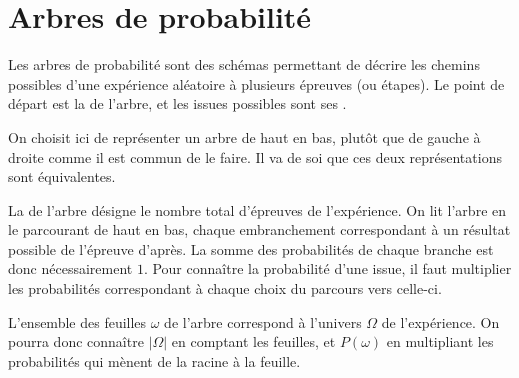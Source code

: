 

\section{Arbres de probabilité}

Les arbres de probabilité sont des schémas permettant de décrire les chemins possibles d'une expérience aléatoire à plusieurs épreuves (ou étapes).
Le point de départ est la  de l'arbre, et les issues possibles sont ses .

On choisit ici de représenter un arbre de haut en bas, plutôt que de gauche à droite comme il est commun de le faire.
Il va de soi que ces deux représentations sont équivalentes.

La  de l'arbre désigne le nombre total d'épreuves de l'expérience.
On lit l'arbre en le parcourant de haut en bas, chaque embranchement correspondant à un résultat possible de l'épreuve d'après.
La somme des probabilités de chaque branche est donc nécessairement $1$.
Pour connaître la probabilité d'une issue, il faut multiplier les probabilités correspondant à chaque choix du parcours vers celle-ci.

L'ensemble des feuilles $\omega$ de l'arbre correspond à l'univers $\Omega$ de l'expérience.
On pourra donc connaître $|\Omega|$ en comptant les feuilles, et $P(\omega)$ en multipliant les probabilités qui mènent de la racine à la feuille.

